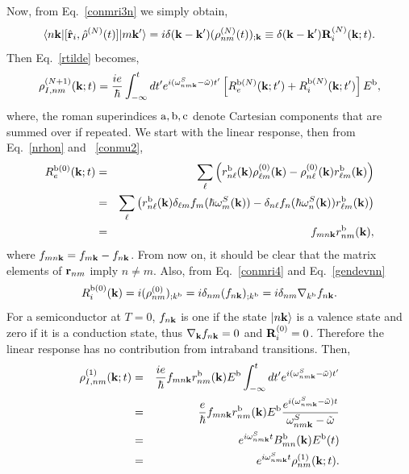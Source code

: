 \documentclass[floatfix,prb,aps,superscriptaddress,11pt,preprint]{revtex4}
\begin{document}
 Now, from Eq.~\eqref{conmri3n} we simply obtain,
\begin{equation}\label{conmri4}
\langle n\mathbf{k} |[\hat{\mathbf{r}}_i,\hat\rho^{(N)}(t)]| m\mathbf{k}' \rangle
=i \delta(\mathbf{k}-\mathbf{k}') (\rho^{(N)}_{nm}(t))_{;\mathbf{k}}
\equiv \delta(\mathbf{k}-\mathbf{k}')\mathbf{R}_i^{(N)}(\mathbf{k};t)
.
\end{equation}
Then Eq.~\eqref{rtilde} becomes,
\begin{equation}\label{rtilde2}
{\rho}^{(N+1)}_{I,nm}(\mathbf{k};t)
=\frac{ie}{\hbar}\int_{-\infty}^t dt'
e^{i(\omega^S_{nm\mathbf{k}}-\tilde\omega)t'}
\left[R_e^{\mathrm{b}(N)}(\mathbf{k};t')+R_i^{\mathrm{b}(N)}(\mathbf{k};t')\right]E^{\mathrm{b}}
,
\end{equation}
 where, the roman superindices
$\mathrm{a},\mathrm{b},\mathrm{c}$ denote Cartesian components that are summed over if repeated.
We start with the linear response, 
 then from Eq.~\eqref{nrhon} and ~\eqref{conmu2},
\begin{eqnarray}\label{R0e}
R_e^{\mathrm{b}(0)}(\mathbf{k};t)
&=&
\sum_{\ell}
\left(
r^{\mathrm{b}}_{n\ell}(\mathbf{k})
{\rho}^{(0)}_{\ell m}(\mathbf{k})
-
{\rho}^{(0)}_{n\ell}(\mathbf{k})
r^{\mathrm{b}}_{\ell m}(\mathbf{k})
\right)
\nonumber \\
&=&
\sum_{\ell}
\left(
r^{\mathrm{b}}_{n\ell}(\mathbf{k})
\delta_{\ell m}f_m(\hbar\omega^S_m(\mathbf{k}))
-
\delta_{n\ell}f_n(\hbar\omega^S_n(\mathbf{k}))
r^{\mathrm{b}}_{\ell m}(\mathbf{k})
\right)
\nonumber \\
&=&
f_{mn\mathbf{k}}
r^{\mathrm{b}}_{nm}(\mathbf{k})
,
\end{eqnarray}
where $f_{mn\mathbf{k}}=f_{m\mathbf{k}}-f_{n\mathbf{k}}$.
From now on,
  it should be clear that the matrix elements of $\mathbf{r}_{nm}$ imply
 $n\neq m$.
Also, from Eq.~\eqref{conmri4} and Eq.~\eqref{gendevnn}
\begin{equation}\label{R0i}
R_i^{\mathrm{b}(0)}(\mathbf{k})=i(\rho^{(0)}_{nm})_{;k^{\mathrm{b}}}=i\delta_{nm}(f_{n\mathbf{k}})_{;k^{\mathrm{b}}}=i\delta_{nm}\nabla_{k^{\mathrm{b}}} f_{n\mathbf{k}}
.
\end{equation}
For a semiconductor at $T=0$, $f_{n\mathbf{k}}$ is one if the state
$| n\mathbf{k} \rangle$ is a valence state and zero if it is a conduction state,
thus $\nabla_{\mathbf{k}} f_{n\mathbf{k}}=0$ and $\mathbf{R}_i^{(0)}=0$. 
Therefore
the linear response has no contribution from
intraband transitions.
 Then,
\begin{eqnarray}\label{rtilde2n}
{\rho}^{(1)}_{I,nm}(\mathbf{k};t)
&=&\frac{ie}{\hbar}
f_{mn\mathbf{k}}
r^{\mathrm{b}}_{nm}(\mathbf{k})E^{\mathrm{b}}
\int_{-\infty}^t dt'
e^{i(\omega^S_{nm\mathbf{k}}-\tilde\omega)t'}
\nonumber \\
&=&\frac{e}{\hbar}
f_{mn\mathbf{k}}
r^{\mathrm{b}}_{nm}(\mathbf{k})E^{\mathrm{b}}
\frac{e^{i(\omega^S_{nm\mathbf{k}}-\tilde\omega)t}}
{\omega^S_{nm\mathbf{k}}-\tilde\omega}
\nonumber \\
&=&
e^{i\omega^S_{nm\mathbf{k}}t}
B^{\mathrm{b}}_{mn}(\mathbf{k})E^{\mathrm{b}}(t)
\nonumber \\
&=&
e^{i\omega^S_{nm\mathbf{k}}t}
\rho^{(1)}_{nm}(\mathbf{k};t)
.
\end{eqnarray}
\end{document}
